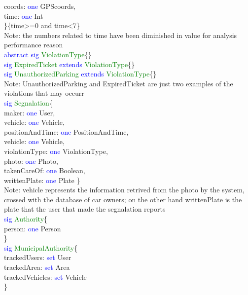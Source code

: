 coords: \textcolor{blue}{one} GPScoords,\\
time: \textcolor{blue}{one} Int\\ 
\}\{time>=0 and time<7\} \\
Note: the numbers related to time have been diminished in value for analysis performance reason\\
\textcolor{blue}{abstract sig}
\textcolor{green}{ViolationType}\{\} \\
\textcolor{blue}{sig}
\textcolor{green}{ExpiredTicket}
\textcolor{blue}{extends}
\textcolor{green}{ViolationType}\{\} \\
\textcolor{blue}{sig}
\textcolor{green}{UnauthorizedParking}
\textcolor{blue}{extends}
\textcolor{green}{ViolationType}\{\} \\
Note: UnauthorizedParking and ExpiredTicket are just two examples of the violations that may occurr\\
\textcolor{blue}{sig}
\textcolor{green}{Segnalation}\{ \\
maker: \textcolor{blue}{one} User,\\
vehicle: \textcolor{blue}{one} Vehicle,\\ 
positionAndTime: \textcolor{blue}{one} PositionAndTime,\\
vehicle: \textcolor{blue}{one} Vehicle,\\
violationType: \textcolor{blue}{one} ViolationType,\\
photo: \textcolor{blue}{one} Photo,\\
takenCareOf: \textcolor{blue}{one} Boolean,\\
writtenPlate: \textcolor{blue}{one} Plate
\}\ \\
Note: vehicle represents the information retrived from the photo by the system, crossed with the database of car owners; on the other hand writtenPlate is the plate that the user that made the segnalation reports\\
\textcolor{blue}{sig}
\textcolor{green}{Authority}\{\\
person: \textcolor{blue}{one} Person\\
\} \\
\textcolor{blue}{sig}
\textcolor{green}{MunicipalAuthority}\{\\
trackedUsers: \textcolor{blue}{set} User\\
trackedArea: \textcolor{blue}{set} Area\\
trackedVehicles: \textcolor{blue}{set} Vehicle\\
\} \\
